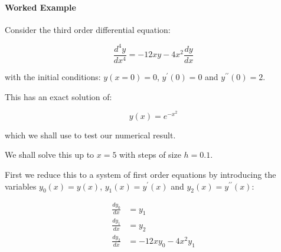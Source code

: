 \documentclass[11pt]{article}
\begin{document}
    \hypertarget{worked-example}{%
\paragraph{Worked Example}\label{worked-example}}





    Consider the third order differential equation:

\[
\frac{d^{4}y}{dx^4} = -12 x y - 4 x^2 \frac{d y}{dx}
\]

with the initial conditions: \(y(x = 0) = 0\), \(y^\prime(0) = 0\) and
\(y^{\prime\prime}(0) = 2\).

This has an exact solution of:

\[
y(x) = e^{-x^2}
\]

which we shall use to test our numerical result.

We shall solve this up to \(x = 5\) with steps of size \(h = 0.1\).

First we reduce this to a system of first order equations by introducing
the variables \(y_0(x) = y(x)\), \(y_1(x) = y^\prime(x)\) and
\(y_2(x) = y^{\prime\prime}(x)\):

\begin{align*}
\frac{d y_0}{dx} &= y_1\\
\frac{d y_1}{dx} &= y_2\\
\frac{d y_2}{dx} &= -12 x y_0 - 4 x^2 y_1
\end{align*}
\end{document}
